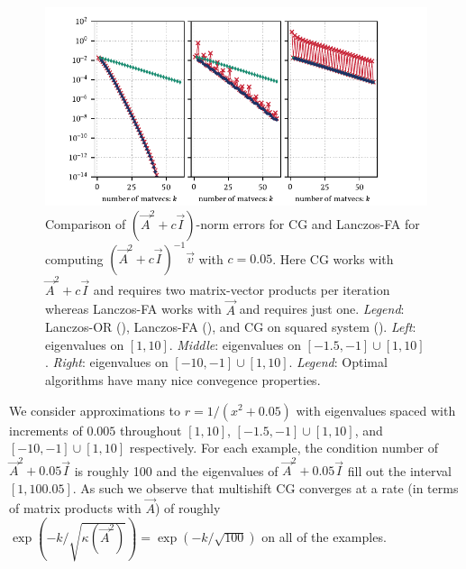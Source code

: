 \begin{figure}[htb]
    \centering
    \includegraphics[]{imgs/ch6_lanczos_msCG_squared.pdf}
    \caption[{Comparison of $(\vec{A}^2+c\vec{I})$-norm errors for CG and Lanczos-FA for computing $(\vec{A}^{2}+c\vec{I})^{-1}\vec{v}$ with \( c=0.05 \).}]{%
    Comparison of $(\vec{A}^2+c\vec{I})$-norm errors for CG and Lanczos-FA for computing $(\vec{A}^{2}+c\vec{I})^{-1}\vec{v}$ with \( c=0.05 \).  
    Here CG works with $\vec{A}^2+c\vec{I}$ and requires two matrix-vector products per iteration whereas Lanczos-FA works with $\vec{A}$ and requires just one.
    \hspace{.25em}\emph{Legend}: Lanczos-OR 
    ({\protect{}}), 
    Lanczos-FA 
    ({\protect{}}), and
    CG on squared system 
    ({\protect{}}). 
    \hspace{.5em}
    \emph{Left}: eigenvalues on $[1,10]$. 
    \emph{Middle}: eigenvalues on $[-1.5,-1]\cup[1,10]$.
    \emph{Right}: eigenvalues on $[-10,-1]\cup[1,10]$. 
    \hspace{.25em}\emph{Legend}: Optimal algorithms have many nice convegence properties.
    }
    \label{fig:msCG_squared}
\end{figure}

We consider approximations to $r = 1/(x^2+0.05)$ with eigenvalues spaced with increments of $0.005$ throughout $[1,10]$, $[-1.5,-1]\cup[1,10]$, and $[-10,-1]\cup[1,10]$ respectively.
For each  example, the condition number of $\vec{A}^2+0.05\vec{I}$ is roughly 100 and the eigenvalues of $\vec{A}^2+0.05 \vec{I}$ fill out the interval $[1,100.05]$.
As such we observe that multishift CG converges at a rate (in terms of matrix products with $\vec{A}$) of roughly $\exp(-k/\sqrt{\kappa(\vec{A}^2)}) = \exp(-k/\sqrt{100})$ on all of the examples.

